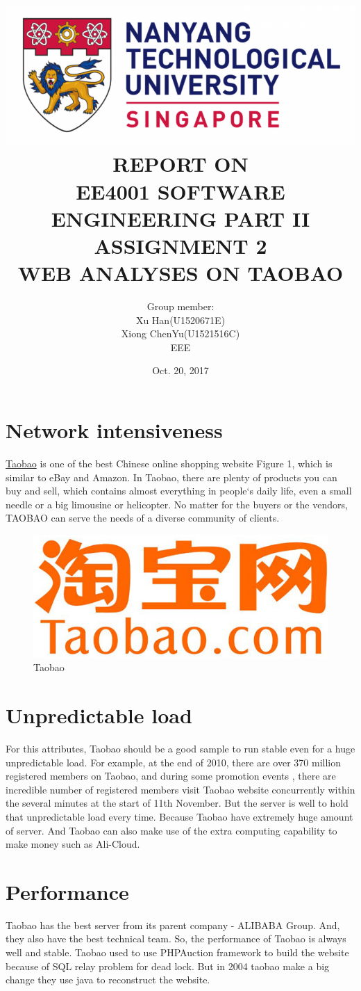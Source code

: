 \documentclass[titlepage]{article}
\author{Group member: \\
Xu Han(U1520671E) \\
Xiong ChenYu(U1521516C) \\
EEE \\
}
\date{Oct. 20, 2017 \\
}
\title{\includegraphics[width=\textwidth]{img/NTU.png} \\
[2\baselineskip] REPORT ON \\
EE4001 SOFTWARE ENGINEERING PART II \\
ASSIGNMENT 2 \\
WEB ANALYSES ON TAOBAO \\
[3\baselineskip]}
\begin{document}
\maketitle
\tableofcontents

\listoffigures

\newpage
\section{Network intensiveness}
\label{sec:org6fcc278}
\hyperref[fig:org1dd30bc]{Taobao} is one of the best Chinese online shopping website Figure 1, which is similar to
eBay and Amazon. In Taobao, there are plenty of products you can buy and sell,
which contains almost everything in people`s daily life, even a small needle
or a big limousine or helicopter. No matter for the buyers or the vendors,
TAOBAO can serve the needs of a diverse community of clients.

\begin{figure}[htbp]
\caption{\label{fig:org1dd30bc}
Taobao}
\centering
\includegraphics[width=.9\linewidth]{./img/t.png}
\end{figure}
\section{Unpredictable load}
\label{sec:org6a78253}
For this attributes, Taobao should be a good sample to run stable even for a
huge unpredictable load. For example, at the end of 2010, there are over 370
million registered members on Taobao, and during some promotion events , there
are incredible number of registered members visit Taobao website concurrently within the
several minutes at the start of 11th November. But the server is well to hold
that unpredictable load every time. Because Taobao have extremely huge
amount of server. And Taobao can also make use of the extra computing
capability to make money such as Ali-Cloud.

\section{Performance}
\label{sec:orgda7767e}
Taobao has the best server from its parent company - ALIBABA Group. And, they
also have the best technical team. So, the performance of Taobao is always
well and stable. Taobao used to use PHPAuction framework to build the website
because of SQL relay problem for dead lock. But in 2004 taobao make a big
change they use java to reconstruct the website.
\end{document}
